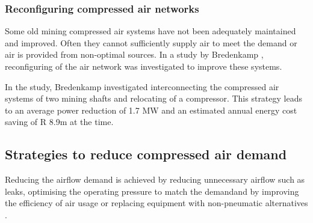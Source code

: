 		\subsubsection{Reconfiguring compressed air networks}
			Some old mining compressed air systems have not been adequately maintained and improved. Often they cannot sufficiently supply air to meet the demand or air is provided from non-optimal sources. In a study by Bredenkamp \cite{Bredenkamp2013Masters}, reconfiguring of the air network was investigated to improve these systems.
			\par 
			In the study, Bredenkamp investigated interconnecting the compressed air systems of two mining shafts and relocating of a compressor. This strategy leads to an average power reduction of 1.7 MW and an estimated annual energy cost saving of R 8.9m at the time.
			
	\subsection{Strategies to reduce compressed air demand}
	Reducing the airflow demand is achieved by reducing unnecessary airflow such as leaks, optimising the operating pressure to match the demand\footnotemark[2] and by improving the efficiency of air usage or replacing equipment with non-pneumatic alternatives \cite{Snyman2011Masters}.
